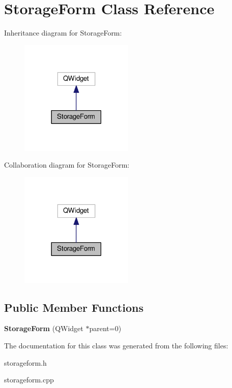 \hypertarget{class_storage_form}{}\section{Storage\+Form Class Reference}
\label{class_storage_form}


Inheritance diagram for Storage\+Form\+:
\nopagebreak
\begin{figure}[H]
\begin{center}
\leavevmode
\includegraphics[width=153pt]{class_storage_form__inherit__graph}
\end{center}
\end{figure}


Collaboration diagram for Storage\+Form\+:
\nopagebreak
\begin{figure}[H]
\begin{center}
\leavevmode
\includegraphics[width=153pt]{class_storage_form__coll__graph}
\end{center}
\end{figure}
\subsection*{Public Member Functions}
\begin{DoxyCompactItemize}
\item 
{\bfseries Storage\+Form} (Q\+Widget $\ast$parent=0)\hypertarget{class_storage_form_a6a989c31e8fa6e48c6e1bf155956ac4c}{}\label{class_storage_form_a6a989c31e8fa6e48c6e1bf155956ac4c}

\end{DoxyCompactItemize}


The documentation for this class was generated from the following files\+:\begin{DoxyCompactItemize}
\item 
storageform.\+h\item 
storageform.\+cpp\end{DoxyCompactItemize}
